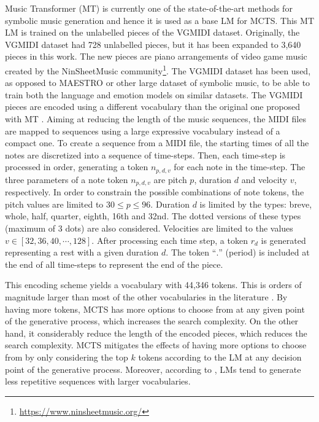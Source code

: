 Music Transformer (MT) \cite{huang2018music} is currently one of the state-of-the-art methods for symbolic music generation and hence it is used as a base LM for MCTS. This MT LM is trained on the unlabelled pieces of the VGMIDI dataset. Originally, the VGMIDI dataset had 728 unlabelled pieces, but it has been expanded to 3,640 pieces in this work. The new pieces are piano arrangements of video game music created by the NinSheetMusic community\footnote{\url{https://www.ninsheetmusic.org/}}. The VGMIDI dataset has been used, as opposed to MAESTRO \cite{hawthorne2018enabling} or other large dataset of symbolic music, to be able to train both the language and emotion models on similar datasets.
The VGMIDI pieces are encoded using a different vocabulary than the original one proposed with MT \cite{huang2018music}. Aiming at reducing the length of the music sequences, the MIDI files are mapped to sequences using a large expressive vocabulary instead of a compact one. To create a sequence from a MIDI file, the starting times of all the notes are discretized into a sequence of time-steps. Then, each time-step is processed in order, generating a token $n_{p, d, v}$ for each note in the time-step. The three parameters of a note token $n_{p, d, v}$ are pitch $p$, duration $d$ and velocity $v$, respectively. In order to constrain the possible combinations of note tokens, the pitch values are limited to $30 \leq p \leq 96$. Duration $d$ is limited by the types: breve, whole, half, quarter, eighth, 16th and 32nd. The dotted versions of these types (maximum of 3 dots) are also considered. Velocities are limited to the values $v \in [32, 36, 40, \cdots, 128]$. After processing each time step, a token $r_d$ is generated representing a rest with a given duration $d$. The token ``$.$'' (period) is included at the end of all time-steps to represent the end of the piece.

This encoding scheme yields a vocabulary with 44,346 tokens. This is orders of magnitude larger than most of the other vocabularies in the literature \cite{briot2017deep}. By having more tokens, MCTS has more options to choose from at any given point of the generative process, which increases the search complexity. On the other hand, it considerably reduce the length of the encoded pieces, which reduces the search complexity. MCTS mitigates the effects of having more options to choose from by only considering the top $k$ tokens according to the LM at any decision point of the generative process. Moreover, according to \citet{holtzman2018learning}, LMs tend to generate less repetitive sequences with larger vocabularies.

